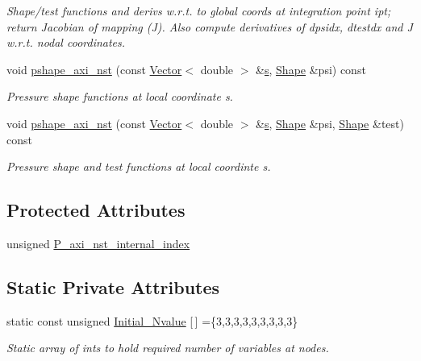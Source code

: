 \begin{DoxyCompactItemize}
\begin{DoxyCompactList}\small\item\em Shape/test functions and derivs w.\+r.\+t. to global coords at integration point ipt; return Jacobian of mapping (J). Also compute derivatives of dpsidx, dtestdx and J w.\+r.\+t. nodal coordinates. \end{DoxyCompactList}\item 
void \hyperlink{classoomph_1_1AxisymmetricQCrouzeixRaviartElement_a6a16bdbe2fc4e1bfe09123c50d101688}{pshape\+\_\+axi\+\_\+nst} (const \hyperlink{classoomph_1_1Vector}{Vector}$<$ double $>$ \&\hyperlink{cfortran_8h_ab7123126e4885ef647dd9c6e3807a21c}{s}, \hyperlink{classoomph_1_1Shape}{Shape} \&psi) const
\begin{DoxyCompactList}\small\item\em Pressure shape functions at local coordinate s. \end{DoxyCompactList}\item 
void \hyperlink{classoomph_1_1AxisymmetricQCrouzeixRaviartElement_af131ceee4d1612696b66ce7ac3a866d1}{pshape\+\_\+axi\+\_\+nst} (const \hyperlink{classoomph_1_1Vector}{Vector}$<$ double $>$ \&\hyperlink{cfortran_8h_ab7123126e4885ef647dd9c6e3807a21c}{s}, \hyperlink{classoomph_1_1Shape}{Shape} \&psi, \hyperlink{classoomph_1_1Shape}{Shape} \&test) const
\begin{DoxyCompactList}\small\item\em Pressure shape and test functions at local coordinte s. \end{DoxyCompactList}\end{DoxyCompactItemize}
\subsection*{Protected Attributes}
\begin{DoxyCompactItemize}
\item 
unsigned \hyperlink{classoomph_1_1AxisymmetricQCrouzeixRaviartElement_a8ec7b0e02c2ab96d0cb9b5238b76b145}{P\+\_\+axi\+\_\+nst\+\_\+internal\+\_\+index}
\end{DoxyCompactItemize}
\subsection*{Static Private Attributes}
\begin{DoxyCompactItemize}
\item 
static const unsigned \hyperlink{classoomph_1_1AxisymmetricQCrouzeixRaviartElement_a6edd4a05741c3ee8ee1ac82f7c3f9eff}{Initial\+\_\+\+Nvalue} \mbox{[}$\,$\mbox{]} =\{3,3,3,3,3,3,3,3,3\}
\begin{DoxyCompactList}\small\item\em Static array of ints to hold required number of variables at nodes. \end{DoxyCompactList}\end{DoxyCompactItemize}
